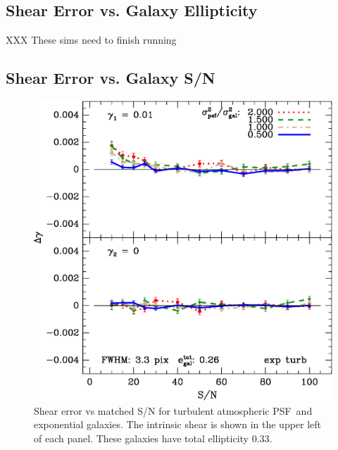 \documentclass[10pt,preprint]{aastex}
\newcommand{\psf}{PSF}
\begin{document}
\subsection{Shear Error vs. Galaxy Ellipticity}


XXX These sims need to finish running



\subsection{Shear Error vs. Galaxy S/N}

\begin{figure}[t] \centering \centering
\includegraphics[scale=0.7]{figures/gmix-fit-et06r02-yr-0.005-0.005-diff.eps}

 \caption{Shear error vs matched S/N for turbulent atmospheric \psf\
 and exponential galaxies. The intrinsic shear is shown in the upper left of
 each panel.  These galaxies have total ellipticity 0.33.
 \label{fig:et06r02}}

\end{figure}
\end{document}
